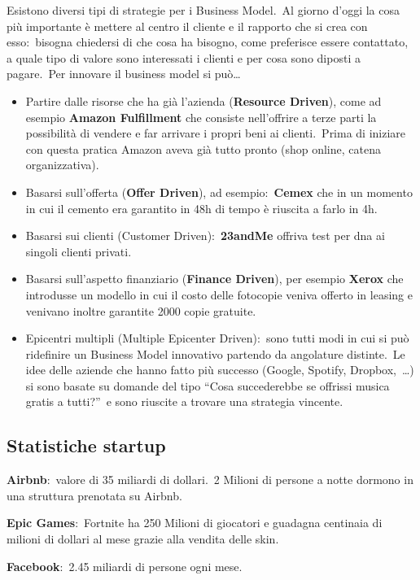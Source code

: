 Esistono diversi tipi di strategie per i Business Model.\
Al giorno d'oggi la cosa più importante è mettere al centro il cliente e il rapporto che si crea con esso:\ bisogna chiedersi di che cosa ha bisogno, come preferisce essere contattato, a quale tipo di valore sono interessati i clienti e per cosa sono diposti a pagare.\
Per innovare il business model si può\dots
\begin{itemize}
    \item Partire dalle risorse che ha già l'azienda (\textbf{Resource Driven}), come ad esempio \textbf{Amazon Fulfillment} che consiste nell'offrire a terze parti la possibilità di vendere e far arrivare i propri beni ai clienti.\ Prima di iniziare con questa pratica Amazon aveva già tutto pronto (shop online, catena organizzativa).
    \item Basarsi sull'offerta (\textbf{Offer Driven}), ad esempio:\ \textbf{Cemex} che in un momento in cui il cemento era garantito in 48h di tempo è riuscita a farlo in 4h.
    \item Basarsi sui clienti (Customer Driven):\ \textbf{23andMe} offriva test per dna ai singoli clienti privati.
    \item Basarsi sull'aspetto finanziario (\textbf{Finance Driven}), per esempio \textbf{Xerox} che introdusse un modello in cui il costo delle fotocopie veniva offerto in leasing e venivano inoltre garantite 2000 copie gratuite.
    \item Epicentri multipli (Multiple Epicenter Driven):\ sono tutti modi in cui si può ridefinire un Business Model innovativo partendo da angolature distinte.\ Le idee delle aziende che hanno fatto più successo (Google, Spotify, Dropbox,\ \dots) si sono basate su domande del tipo ``Cosa succederebbe se offrissi musica gratis a tutti?''\ e sono riuscite a trovare una strategia vincente.\
\end{itemize}

\subsection{Statistiche startup}
\textbf{Airbnb}:\ valore di 35 miliardi di dollari.\
2 Milioni di persone a notte dormono in una struttura prenotata su Airbnb.\

\noindent \textbf{Epic Games}:\ Fortnite ha 250 Milioni di giocatori e guadagna centinaia di milioni di dollari al mese grazie alla vendita delle skin.

\noindent \textbf{Facebook}:\ 2.45 miliardi di persone ogni mese.

